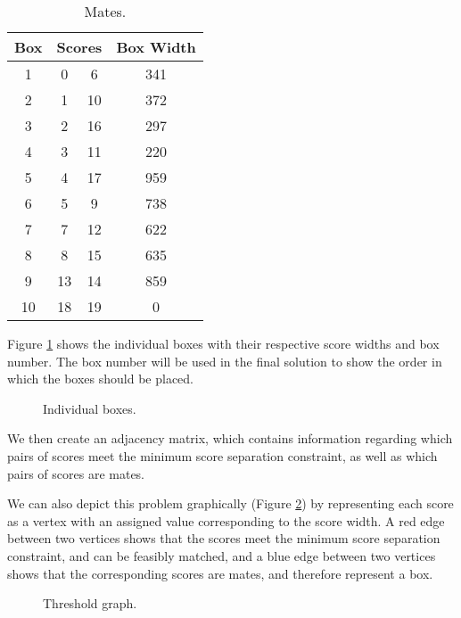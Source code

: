 \documentclass[a4paper, 11pt, twoside, onecolumn, openany]{article}
\begin{document}
\begin{table}[!htb]
	\centering
	\begin{tabular}{|c|c|c|c|}
	\hline
	Box & \multicolumn{2}{|c|}{Scores} & Box Width \\ \hline
	1 & 0 & 6 & 341 \\ \hline
	2 & 1 & 10 & 372 \\ \hline
	3 & 2 & 16 & 297 \\ \hline
	4 & 3 & 11 & 220 \\ \hline
	5 & 4 & 17 & 959 \\ \hline
	6 & 5 & 9 & 738 \\ \hline
	7 & 7 & 12 & 622 \\ \hline
	8 & 8 & 15 & 635 \\ \hline
	9 & 13 & 14 & 859 \\ \hline
	10 & 18 & 19 & 0 \\
	\hline
	\end{tabular}
	\caption{Mates.}
	\label{table:mates}
\end{table}	

Figure \ref{fig:boxes} shows the individual boxes with their respective score widths and box number. The box number will be used in the final solution to show the order in which the boxes should be placed.

\begin{figure}[!htb]	
	\centering
	
	\caption{Individual boxes.}	
	\label{fig:boxes}
\end{figure}

We then create an adjacency matrix, which contains information regarding which pairs of scores meet the minimum score separation constraint, as well as which pairs of scores are mates.

We can also depict this problem graphically (Figure \ref{fig:threshold}) by representing each score as a vertex with an assigned value corresponding to the score width. A red edge between two vertices shows that the scores meet the minimum score separation constraint, and can be feasibly matched, and a blue edge between two vertices shows that the corresponding scores are mates, and therefore represent a box. 



\begin{figure}[!htb]
	\centering
	
	\caption{Threshold graph.}
	\label{fig:threshold}	
\end{figure}
\end{document}
